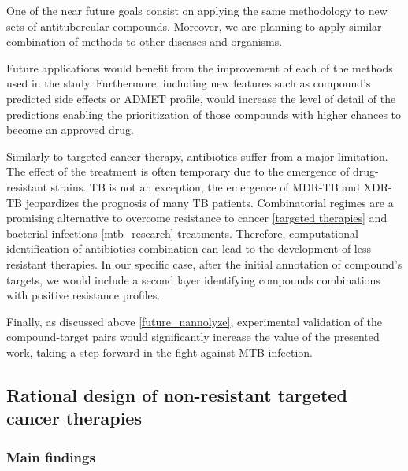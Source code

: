 \documentclass[11pt, b5paper,twoside]{tesi_upf}
\begin{document}
\par One of the near future goals consist on applying the same methodology to new sets of antitubercular compounds. Moreover, we are planning to apply similar combination of methods to other diseases and organisms.   
\par Future applications would benefit from the improvement of each of the methods used in the study. Furthermore, including new features such as compound's predicted side effects or ADMET profile, would increase the level of detail of the predictions enabling the prioritization of those compounds with higher chances to become an approved drug.  

\par Similarly to targeted cancer therapy, antibiotics suffer from a major limitation. The effect of the treatment is often temporary due to the emergence of drug-resistant strains. TB is not an exception, the emergence of MDR-TB and XDR-TB jeopardizes the prognosis of many TB patients. Combinatorial regimes are a promising alternative to overcome resistance to cancer \ref{targeted therapies} and bacterial infections \ref{mtb_research} treatments. Therefore, computational identification of antibiotics combination can lead to the development of less resistant therapies. In our specific case, after the initial annotation of compound's targets, we would include a second layer identifying compounds combinations with positive resistance profiles.   

\par Finally, as discussed above \ref{future_nannolyze}, experimental validation of the compound-target pairs would significantly increase the value of the presented work, taking a step forward in the fight against MTB infection. 

 \subsection{Rational design of non-resistant targeted cancer therapies}
 
 
 
\subsubsection{Main findings} 
\end{document}
